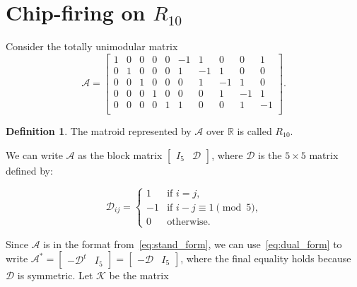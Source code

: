 \documentclass[12p]{amsart}
\numberwithin{equation}{section}
\theoremstyle{plain}
\theoremstyle{definition}
\newtheorem{defn}[thm]{Definition}
\begin{document}
\section{Chip-firing on $R_{10}$}\label{sec:R10} 

Consider the totally unimodular matrix
\begin{equation}\label{eq:R10}\mathcal A = \begin{bmatrix}
    1 & 0 & 0 & 0 & 0 &   -1 & 1 & 0 & 0 & 1\\
    0 & 1 & 0 & 0 & 0 &   1 & -1 & 1 & 0 & 0\\
    0 & 0 & 1 & 0 & 0 &   0 & 1 & -1 & 1 & 0\\
    0 & 0 & 0 & 1 & 0 &   0 & 0 & 1 & -1 & 1\\
    0 & 0 & 0 & 0 & 1 &   1 & 0 & 0 & 1 & -1\\
\end{bmatrix}.\end{equation}

\begin{defn}\label{def:R10}
    The matroid represented by $\mathcal A$ over $\mathbb R$ is called $R_{10}$. 
\end{defn}

We can write $\mathcal A$ as the block matrix $\begin{bmatrix} I_5 & \mathcal D \end{bmatrix}$, where $\mathcal D$ is the $5 \times 5$ matrix defined by:

\[\mathcal D_{ij} = \begin{cases} 1 & \text{if $i=j$,}\\
-1 &\text{if $i-j \equiv 1\pmod 5$,}\\
0 & \text{otherwise.}\end{cases}\]

Since $\mathcal A$ is in the format from~\eqref{eq:stand_form}, we can use~\eqref{eq:dual_form} to write $\mathcal A^* = \begin{bmatrix} -\mathcal D^t & I_5 \end{bmatrix} = \begin{bmatrix} -\mathcal D & I_5 \end{bmatrix}$, where the final equality holds because $\mathcal D$ is symmetric. Let $\mathcal K$ be the matrix 
\end{document}
